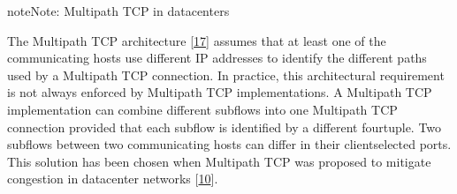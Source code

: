 \documentclass[letterpaper,10pt,english]{sphinxmanual}
\begin{document}
\begin{sphinxadmonition}{note}{Note:}
\sphinxAtStartPar
Multipath TCP in datacenters

\sphinxAtStartPar
The Multipath TCP architecture {[}\hyperlink{cite.biblio:id6033}{17}{]} assumes that at least one of the communicating hosts use different IP addresses to identify the different paths used by a Multipath TCP connection. In practice, this architectural requirement is not always enforced by Multipath TCP implementations. A Multipath TCP implementation can combine different subflows into one Multipath TCP connection provided that each subflow is identified by a different four\sphinxhyphen{}tuple. Two subflows between two communicating hosts can differ in their client\sphinxhyphen{}selected ports. This solution has been chosen when Multipath TCP was proposed to mitigate congestion in datacenter networks {[}\hyperlink{cite.biblio:id8933}{10}{]}.


\end{sphinxadmonition}
\end{document}

